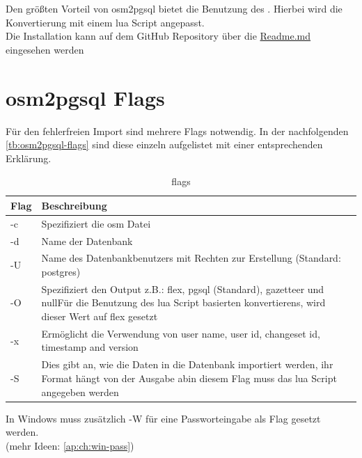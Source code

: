 Den größten Vorteil von osm2pgsql bietet die Benutzung des . Hierbei wird die Konvertierung mit einem lua Script angepasst.\\

Die Installation kann auf dem GitHub Repository über die \href{https://github.com/OpenHistoricalDataMap/OHDMConverter/tree/SteSad#readme}{Readme.md} eingesehen werden\\

\section{osm2pgsql Flags}
Für den fehlerfreien Import sind mehrere Flags notwendig. In der nachfolgenden \autoref{tb:osm2pgsql-flags} sind diese einzeln aufgelistet mit einer entsprechenden Erklärung.
\begin{table}[h]
	\caption{flags}
	\label{tb:osm2pgsql-flags}
	\renewcommand{\arraystretch}{1.5}
	\begin{tabularx}{\linewidth}{|l|X|}\hline
		Flag & Beschreibung\\\hline
		-c & Spezifiziert die osm Datei\\\hline
		-d & Name der Datenbank \\\hline
		-U & Name des Datenbankbenutzers mit Rechten zur Erstellung (Standard: postgres)\\\hline
		-O & Spezifiziert den Output z.B.: flex, pgsql (Standard), gazetteer und null\newline Für die Benutzung des lua Script basierten konvertierens, wird dieser Wert auf flex gesetzt\\\hline
		-x & Ermöglicht die Verwendung von user name, user id, changeset id, timestamp and version\\\hline
		-S & Dies gibt an, wie die Daten in die Datenbank importiert werden, ihr Format hängt von der Ausgabe ab\newline in diesem Flag muss das lua Script angegeben werden\\\hline		
	\end{tabularx}\vspace{0.5cm}
	In Windows muss zusätzlich -W für eine Passworteingabe als Flag gesetzt werden. \\(mehr Ideen: \autoref{ap:ch:win-pass})
\end{table}

\newpage
